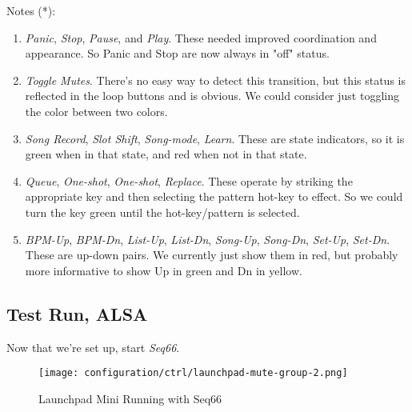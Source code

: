    Notes (*):

   \begin{enumerate}

      \item \textsl{Panic}, \textsl{Stop}, \textsl{Pause}, and \textsl{Play}.
         These needed improved coordination and appearance.
         So Panic and Stop are now always in "off" status.

      \item \textsl{Toggle Mutes}.
         There's no easy way to detect this transition, but
         this status is reflected in the loop buttons and is obvious.
         We could consider just toggling the color between two colors.

      \item \textsl{Song Record}, \textsl{Slot Shift}, \textsl{Song-mode},
         \textsl{Learn}.
         These are state indicators, so it is green when in that state,
         and red when not in that state.

      \item \textsl{Queue}, \textsl{One-shot}, \textsl{One-shot},
      \textsl{Replace}. 
         These operate by striking the appropriate key and then selecting
         the pattern hot-key to effect.  So we could turn the key green
         until the hot-key/pattern is selected.

      \item \textsl{BPM-Up}, \textsl{BPM-Dn}, \textsl{List-Up},
      \textsl{List-Dn}, \textsl{Song-Up}, \textsl{Song-Dn}, \textsl{Set-Up},
      \textsl{Set-Dn}.
         These are up-down pairs.
         We currently just show them in red, but probably more informative to
         show Up in green and Dn in yellow.

   \end{enumerate}

\subsection{Test Run, ALSA}
\label{subsubsec:launchpad_mini_test_run_alsa}

   Now that we're set up, start \textsl{Seq66}.

\begin{figure}[H]
   \centering 
   \texttt{[image: configuration/ctrl/launchpad-mute-group-2.png]}
   \caption{Launchpad Mini Running with Seq66}
   \label{fig:launchpad_mute_group_perspective}
\end{figure}

